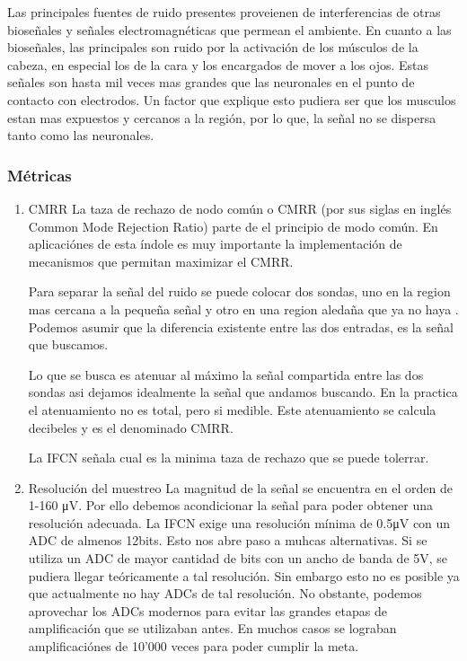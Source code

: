 Las principales fuentes de ruido presentes proveienen de interferencias de otras bioseñales y señales electromagnéticas que permean el ambiente. En cuanto a las bioseñales, las principales son ruido por la activación de los músculos de la cabeza, en especial los de la cara y los encargados de mover a los ojos. Estas señales son hasta mil veces mas grandes que las neuronales en el punto de contacto con electrodos. Un factor que explique esto pudiera ser que los musculos estan mas expuestos y cercanos a la región, por lo que, la señal no se dispersa tanto como las neuronales.

\subsubsection{Métricas}
\label{sec:orgd7674f7}
\begin{enumerate}
\item CMRR
\label{sec:org40f1789}
La taza de rechazo de nodo común o CMRR (por sus siglas en inglés Common Mode Rejection Ratio) parte de el principio de modo común.
En aplicaciónes de esta índole es muy importante la implementación de mecanismos que permitan maximizar el CMRR.

Para separar la señal del ruido se puede colocar dos sondas, uno en la region mas cercana a la pequeña señal y otro en una region aledaña que ya no haya . Podemos asumir que la diferencia existente entre las dos entradas, es la señal que buscamos.

Lo que se busca es atenuar al máximo la señal compartida entre las dos sondas asi dejamos idealmente la señal que andamos buscando. En la practica el atenuamiento no es total, pero si medible. Este atenuamiento se calcula decibeles y es el denominado CMRR.

La IFCN señala cual es la minima taza de rechazo que se puede tolerrar.

\item Resolución del muestreo
\label{sec:org86a529c}
La magnitud de la señal se encuentra en el orden de 1-160 μV. Por ello debemos acondicionar la señal para poder obtener una resolución adecuada. La IFCN exige una resolución mínima de 0.5μV con un ADC de almenos 12bits. Esto nos abre paso a muhcas alternativas. Si se utiliza un ADC de mayor cantidad de bits con un ancho de banda de 5V, se pudiera llegar teóricamente a tal resolución. Sin embargo esto no es posible ya que actualmente no hay ADCs de tal resolución. No obstante, podemos aprovechar los ADCs modernos para evitar las grandes etapas de amplificación que se utilizaban antes. En muchos casos se lograban amplificaciónes de 10’000 veces para poder cumplir la meta.


\end{enumerate}
